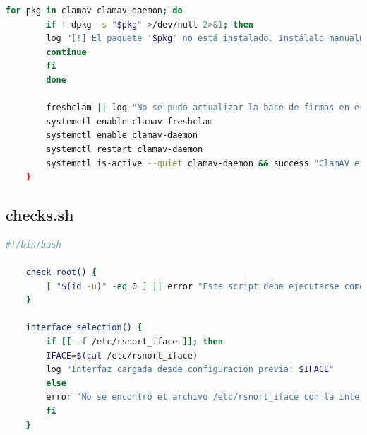 \documentclass[11pt,a4paper,twoside]{report}
\begin{document}
\begin{lstlisting}[language=bash, caption={build\_from\_source.sh}]
		for pkg in clamav clamav-daemon; do
		if ! dpkg -s "$pkg" >/dev/null 2>&1; then
		log "[!] El paquete '$pkg' no está instalado. Instálalo manualmente con: sudo apt install clamav clamav-daemon"
		continue
		fi
		done
		
		freshclam || log "No se pudo actualizar la base de firmas en este momento"
		systemctl enable clamav-freshclam
		systemctl enable clamav-daemon
		systemctl restart clamav-daemon
		systemctl is-active --quiet clamav-daemon && success "ClamAV está activo." || log "ClamAV instalado pero no activo."
	}
\end{lstlisting}

\subsection*{checks.sh}
\begin{lstlisting}[language=bash, caption={checks.sh}, label={lst:checks-sh}]
	#!/bin/bash
	
	check_root() {
		[ "$(id -u)" -eq 0 ] || error "Este script debe ejecutarse como root."
	}
	
	interface_selection() {
		if [[ -f /etc/rsnort_iface ]]; then
		IFACE=$(cat /etc/rsnort_iface)
		log "Interfaz cargada desde configuración previa: $IFACE"
		else
		error "No se encontró el archivo /etc/rsnort_iface con la interfaz seleccionada."
		fi
	}
\end{lstlisting}
\end{document}
